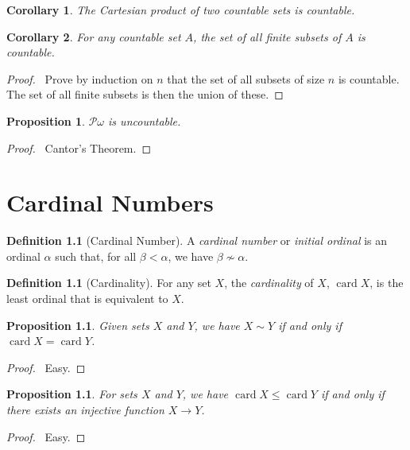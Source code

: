 \documentclass{report}
\let\qed\relax
\newtheorem{prop}[ax]{Proposition}
\newtheorem{cor}{Corollary}[ax]
\theoremstyle{definition}
\newtheorem{df}[ax]{Definition}
\newcommand{\card}{\ensuremath{\operatorname{card}}}
\begin{document}
\begin{cor}
The Cartesian product of two countable sets is countable.
\end{cor}

\begin{cor}
For any countable set $A$, the set of all finite subsets of $A$ is countable.
\end{cor}

\begin{proof}
\pf\ Prove by induction on $n$ that the set of all subsets of size $n$ is countable. The set of all finite subsets is then the union of these. \qed
\end{proof}

\begin{prop}
$\mathcal{P} \omega$ is uncountable.
\end{prop}

\begin{proof}
\pf\ Cantor's Theorem. \qed
\end{proof}

\chapter{Cardinal Numbers}

\begin{df}[Cardinal Number]
A \emph{cardinal number} or \emph{initial ordinal} is an ordinal $\alpha$ such that, for all $\beta < \alpha$, we have $\beta \not\sim \alpha$.
\end{df}

\begin{df}[Cardinality]
For any set $X$, the \emph{cardinality} of $X$, $\card X$, is the least ordinal that is equivalent to $X$.
\end{df}

\begin{prop}
Given sets $X$ and $Y$, we have $X \sim Y$ if and only if $\card X = \card Y$.
\end{prop}

\begin{proof}
\pf\ Easy. \qed
\end{proof}

\begin{prop}
For sets $X$ and $Y$, we have $\card X \leq \card Y$ if and only if there exists an injective function $X \rightarrow Y$.
\end{prop}

\begin{proof}
\pf\ Easy. \qed
\end{proof}
\end{document}
